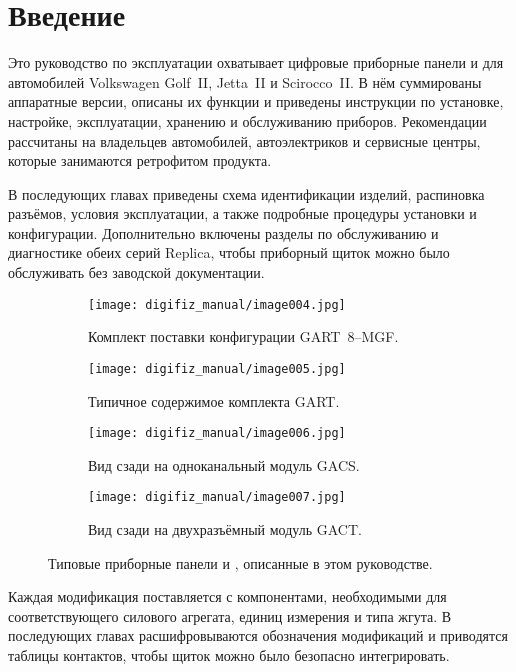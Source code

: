\chapter{Введение}\label{ch:introduction-ru}

Это руководство по эксплуатации охватывает цифровые приборные панели \ReplicaGenOne{} и \ReplicaNextLong{} для автомобилей Volkswagen Golf~II, Jetta~II и Scirocco~II.
В нём суммированы аппаратные версии, описаны их функции и приведены инструкции по установке, настройке, эксплуатации, хранению и обслуживанию приборов.
Рекомендации рассчитаны на владельцев автомобилей, автоэлектриков и сервисные центры, которые занимаются ретрофитом продукта.

В последующих главах приведены схема идентификации изделий, распиновка разъёмов, условия эксплуатации, а также подробные процедуры установки и конфигурации.
Дополнительно включены разделы по обслуживанию и диагностике обеих серий Replica, чтобы приборный щиток можно было обслуживать без заводской документации.

\begin{figure}[htbp]
    \centering
    \begin{subfigure}{0.48\textwidth}
        \texttt{[image: digifiz\_manual/image004.jpg]}
        \caption{Комплект поставки конфигурации GART~8--MGF.}
    \end{subfigure}\hfill
    \begin{subfigure}{0.48\textwidth}
        \texttt{[image: digifiz\_manual/image005.jpg]}
        \caption{Типичное содержимое комплекта GART.}
    \end{subfigure}
    \begin{subfigure}{0.48\textwidth}
        \texttt{[image: digifiz\_manual/image006.jpg]}
        \caption{Вид сзади на одноканальный модуль GACS.}
    \end{subfigure}\hfill
    \begin{subfigure}{0.48\textwidth}
        \texttt{[image: digifiz\_manual/image007.jpg]}
        \caption{Вид сзади на двухразъёмный модуль GACT.}
    \end{subfigure}
    \caption{Типовые приборные панели \ReplicaGenOne{} и \ReplicaNextLong{}, описанные в этом руководстве.}
\end{figure}

Каждая модификация поставляется с компонентами, необходимыми для соответствующего силового агрегата, единиц измерения и типа жгута.
В последующих главах расшифровываются обозначения модификаций и приводятся таблицы контактов, чтобы щиток можно было безопасно интегрировать.
